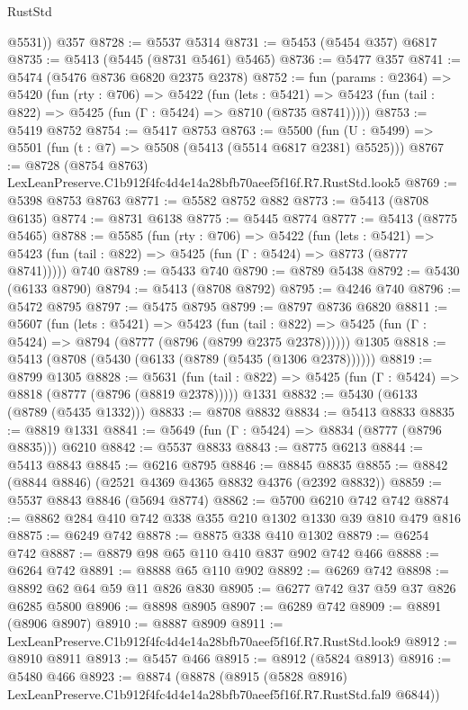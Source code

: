 \begin{lexlean}{RustStd}
\begin{coremodule}
        @5531))
    @357
@8728 := @5537 @5314
@8731 := @5453 (@5454 @357) @6817
@8735 := @5413 (@5445 (@8731 @5461) @5465)
@8736 := @5477 @357
@8741 := @5474 (@5476 @8736 @6820 @2375 @2378)
@8752 := fun (params : @2364) =>
  @5420
    (fun (rty : @706) =>
    @5422
      (fun (lets : @5421) =>
      @5423 (fun (tail : @822) => @5425 (fun (Γ : @5424) => @8710 (@8735 @8741)))))
@8753 := @5419 @8752
@8754 := @5417 @8753
@8763 := @5500 (fun (U : @5499) => @5501 (fun (t : @7) => @5508 (@5413 (@5514 @6817 @2381) @5525)))
@8767 := @8728 (@8754 @8763) LexLeanPreserve.C1b912f4fc4d4e14a28bfb70aeef5f16f.R7.RustStd.look5
@8769 := @5398 @8753 @8763
@8771 := @5582 @8752 @882
@8773 := @5413 (@8708 @6135)
@8774 := @8731 @6138
@8775 := @5445 @8774
@8777 := @5413 (@8775 @5465)
@8788 := @5585
    (fun (rty : @706) =>
    @5422
      (fun (lets : @5421) =>
      @5423 (fun (tail : @822) => @5425 (fun (Γ : @5424) => @8773 (@8777 @8741)))))
    @740
@8789 := @5433 @740
@8790 := @8789 @5438
@8792 := @5430 (@6133 @8790)
@8794 := @5413 (@8708 @8792)
@8795 := @4246 @740
@8796 := @5472 @8795
@8797 := @5475 @8795
@8799 := @8797 @8736 @6820
@8811 := @5607
    (fun (lets : @5421) =>
    @5423
      (fun (tail : @822) => @5425 (fun (Γ : @5424) => @8794 (@8777 (@8796 (@8799 @2375 @2378))))))
    @1305
@8818 := @5413 (@8708 (@5430 (@6133 (@8789 (@5435 (@1306 @2378))))))
@8819 := @8799 @1305
@8828 := @5631
    (fun (tail : @822) => @5425 (fun (Γ : @5424) => @8818 (@8777 (@8796 (@8819 @2378)))))
    @1331
@8832 := @5430 (@6133 (@8789 (@5435 @1332)))
@8833 := @8708 @8832
@8834 := @5413 @8833
@8835 := @8819 @1331
@8841 := @5649 (fun (Γ : @5424) => @8834 (@8777 (@8796 @8835))) @6210
@8842 := @5537 @8833
@8843 := @8775 @6213
@8844 := @5413 @8843
@8845 := @6216 @8795
@8846 := @8845 @8835
@8855 := @8842 (@8844 @8846) (@2521 @4369 @4365 @8832 @4376 (@2392 @8832))
@8859 := @5537 @8843 @8846 (@5694 @8774)
@8862 := @5700 @6210 @742 @742
@8874 := @8862 @284 @410 @742 @338 @355 @210 @1302 @1330 @39 @810 @479 @816
@8875 := @6249 @742
@8878 := @8875 @338 @410 @1302
@8879 := @6254 @742
@8887 := @8879 @98 @65 @110 @410 @837 @902 @742 @466
@8888 := @6264 @742
@8891 := @8888 @65 @110 @902
@8892 := @6269 @742
@8898 := @8892 @62 @64 @59 @11 @826 @830
@8905 := @6277 @742 @37 @59 @37 @826 @6285 @5800
@8906 := @8898 @8905
@8907 := @6289 @742
@8909 := @8891 (@8906 @8907)
@8910 := @8887 @8909
@8911 := LexLeanPreserve.C1b912f4fc4d4e14a28bfb70aeef5f16f.R7.RustStd.look9
@8912 := @8910 @8911
@8913 := @5457 @466
@8915 := @8912 (@5824 @8913)
@8916 := @5480 @466
@8923 := @8874
    (@8878
      (@8915 (@5828 @8916) LexLeanPreserve.C1b912f4fc4d4e14a28bfb70aeef5f16f.R7.RustStd.fal9 @6844))

\end{coremodule}
\end{lexlean}
